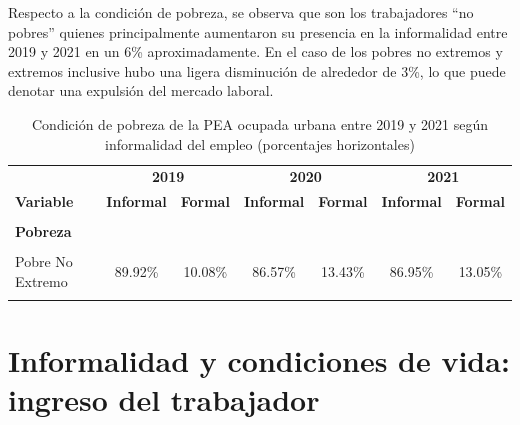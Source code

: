 \documentclass[
  letterpaper,
  12pt,
  oneside,
  spanish,
  doublespacing,
  headsepline,
  parskip]{MastersDoctoralThesis}
\begin{document}
Respecto a la condición de pobreza, se observa que son los trabajadores
``no pobres'' quienes principalmente aumentaron su presencia en la
informalidad entre 2019 y 2021 en un 6\% aproximadamente. En el caso de
los pobres no extremos y extremos inclusive hubo una ligera disminución
de alrededor de 3\%, lo que puede denotar una expulsión del mercado
laboral.

\hypertarget{tbl-pobr}{}
\begin{table}[H]
\caption{\label{tbl-pobr}Condición de pobreza de la PEA ocupada urbana entre 2019 y 2021 según
informalidad del empleo (porcentajes horizontales) }\tabularnewline

\centering\begingroup\fontsize{10}{12}\selectfont

\begin{tabular}{lcccccc}
\toprule
\multicolumn{1}{c}{ } & \multicolumn{2}{c}{\textbf{2019}} & \multicolumn{2}{c}{\textbf{2020}} & \multicolumn{2}{c}{\textbf{2021}} \\
\cmidrule(l{3pt}r{3pt}){2-3} \cmidrule(l{3pt}r{3pt}){4-5} \cmidrule(l{3pt}r{3pt}){6-7}
\textbf{Variable} & \textbf{Informal} & \textbf{Formal} & \textbf{Informal} & \textbf{Formal} & \textbf{Informal} & \textbf{Formal}\\
\midrule
\cellcolor{gray!6}{\textbf{Nacional}} & \cellcolor{gray!6}{66.40\%} & \cellcolor{gray!6}{33.60\%} & \cellcolor{gray!6}{68.42\%} & \cellcolor{gray!6}{31.58\%} & \cellcolor{gray!6}{71.41\%} & \cellcolor{gray!6}{28.59\%}\\
\textbf{Pobreza} &  &  &  &  &  & \\
\cellcolor{gray!6}{Pobre Extremo} & \cellcolor{gray!6}{98.97\%} & \cellcolor{gray!6}{1.03\%} & \cellcolor{gray!6}{94.30\%} & \cellcolor{gray!6}{5.70\%} & \cellcolor{gray!6}{94.16\%} & \cellcolor{gray!6}{5.84\%}\\
Pobre No Extremo & 89.92\% & 10.08\% & 86.57\% & 13.43\% & 86.95\% & 13.05\%\\
\cellcolor{gray!6}{No Pobre} & \cellcolor{gray!6}{63.81\%} & \cellcolor{gray!6}{36.19\%} & \cellcolor{gray!6}{64.26\%} & \cellcolor{gray!6}{35.74\%} & \cellcolor{gray!6}{68.46\%} & \cellcolor{gray!6}{31.54\%}\\
\bottomrule
\end{tabular}
\endgroup{}
\end{table}

\hypertarget{informalidad-y-condiciones-de-vida-ingreso-del-trabajador}{%
\section{Informalidad y condiciones de vida: ingreso del
trabajador}\label{informalidad-y-condiciones-de-vida-ingreso-del-trabajador}}
\end{document}
